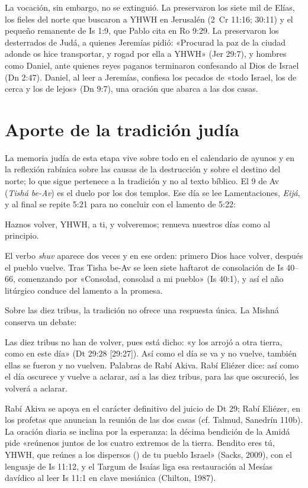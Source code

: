 La vocación, sin embargo, no se extinguió. La preservaron los siete mil de Elías, los fieles del norte que buscaron a YHWH en Jerusalén (2~Cr 11:16; 30:11) y el pequeño remanente de Is 1:9, que Pablo cita en Ro 9:29. La preservaron los desterrados de Judá, a quienes Jeremías pidió: «Procurad la paz de la ciudad adonde os hice transportar, y rogad por ella a YHWH» (Jer 29:7), y hombres como Daniel, ante quienes reyes paganos terminaron confesando al Dios de Israel (Dn 2:47). Daniel, al leer a Jeremías, confiesa los pecados de «todo Israel, los de cerca y los de lejos» (Dn 9:7), una oración que abarca a las dos casas.

\section{Aporte de la tradición judía}

La memoria judía de esta etapa vive sobre todo en el calendario de ayunos y en la reflexión rabínica sobre las causas de la destrucción y sobre el destino del norte; lo que sigue pertenece a la tradición y no al texto bíblico. El 9 de Av (\emph{Tishá be-Av}) es el duelo por los dos templos. Ese día se lee Lamentaciones, \emph{Eijá}, y al final se repite 5:21 para no concluir con el lamento de 5:22:
\begin{cita}Haznos volver, YHWH, a ti, y volveremos; renueva nuestros días como al principio.\end{cita}
El verbo \emph{shuv} aparece dos veces y en ese orden: primero Dios hace volver, después el pueblo vuelve. Tras Tisha be-Av se leen siete haftarot de consolación de Is 40--66, comenzando por «Consolad, consolad a mi pueblo» (Is 40:1), y así el año litúrgico conduce del lamento a la promesa.

Sobre las diez tribus, la tradición no ofrece una respuesta única. La Mishná conserva un debate:
\begin{cita}Las diez tribus no han de volver, pues está dicho: «y los arrojó a otra tierra, como en este día» (Dt 29:28 [29:27]). Así como el día se va y no vuelve, también ellas se fueron y no vuelven. Palabras de Rabí Akiva. Rabí Eliézer dice: así como el día oscurece y vuelve a aclarar, así a las diez tribus, para las que oscureció, les volverá a aclarar.\end{cita}
Rabí Akiva se apoya en el carácter definitivo del juicio de Dt 29; Rabí Eliézer, en los profetas que anuncian la reunión de las dos casas (cf. Talmud, Sanedrín 110b). La oración diaria se inclina por la esperanza: la décima bendición de la Amidá pide «reúnenos juntos de los cuatro extremos de la tierra. Bendito eres tú, YHWH, que reúnes a los dispersos () de tu pueblo Israel» (Sacks, 2009), con el lenguaje de Is 11:12, y el Targum de Isaías liga esa restauración al Mesías davídico al leer Is 11:1 en clave mesiánica (Chilton, 1987).

